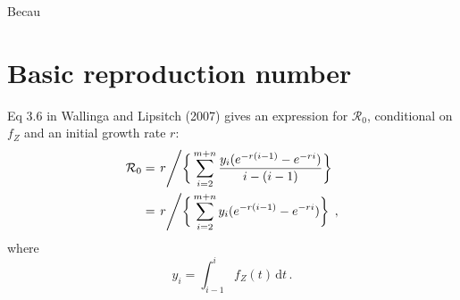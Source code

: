 \documentclass[12pt]{article}
\begin{document}
Becau

\section{Basic reproduction number}


Eq 3.6 in Wallinga and Lipsitch (2007) gives an expression for 
$\mathcal{R}_0$, conditional on $f_Z$ and an initial growth rate $r$:
%
\begin{equation}
  \begin{aligned}
    \mathcal{R}_0
    &= \left. r \middle/ \bigg\{\sum_{i=2}^{m+n} \frac{y_i (e^{-r (i-1)} - e^{-r i})}{i - (i-1)}\bigg\} \right. \\
    &= \left. r \middle/ \bigg\{\sum_{i=2}^{m+n} y_i (e^{-r (i-1)} - e^{-r i})\bigg\} \right.\,,
   \end{aligned}
\end{equation}
%
where
%
\begin{equation}
y_i = \int_{i-1}^{i} f_Z(t)\,\text{d}t\,.
\end{equation}
\end{document}
